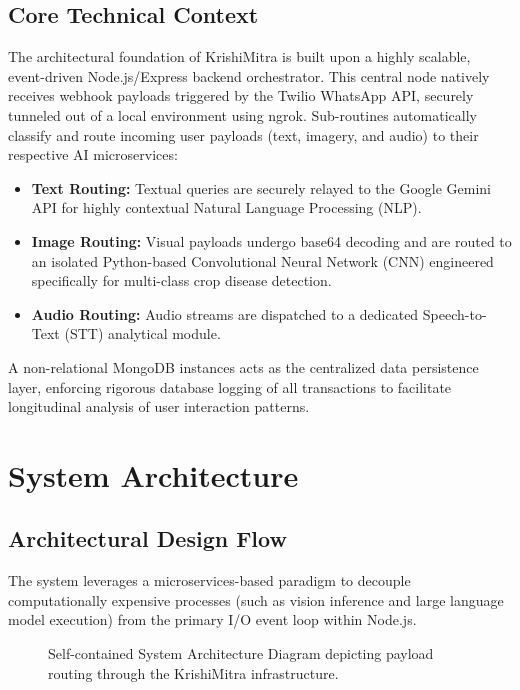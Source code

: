 \documentclass[12pt, a4paper]{report}
\begin{document}
\section{Core Technical Context}
The architectural foundation of KrishiMitra is built upon a highly scalable, event-driven Node.js/Express backend orchestrator. This central node natively receives webhook payloads triggered by the Twilio WhatsApp API, securely tunneled out of a local environment using ngrok. Sub-routines automatically classify and route incoming user payloads (text, imagery, and audio) to their respective AI microservices:
\begin{itemize}
    \item \textbf{Text Routing:} Textual queries are securely relayed to the Google Gemini API for highly contextual Natural Language Processing (NLP).
    \item \textbf{Image Routing:} Visual payloads undergo base64 decoding and are routed to an isolated Python-based Convolutional Neural Network (CNN) engineered specifically for multi-class crop disease detection.
    \item \textbf{Audio Routing:} Audio streams are dispatched to a dedicated Speech-to-Text (STT) analytical module.
\end{itemize}
A non-relational MongoDB instances acts as the centralized data persistence layer, enforcing rigorous database logging of all transactions to facilitate longitudinal analysis of user interaction patterns.

\chapter{System Architecture}

\section{Architectural Design Flow}
The system leverages a microservices-based paradigm to decouple computationally expensive processes (such as vision inference and large language model execution) from the primary I/O event loop within Node.js. 

\begin{figure}[H]
    \centering
    \resizebox{\textwidth}{!}{
    
    }
    \caption{Self-contained System Architecture Diagram depicting payload routing through the KrishiMitra infrastructure.}
    \label{fig:architecture}
\end{figure}
\end{document}
